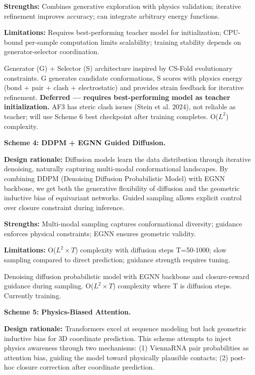 \documentclass[12pt]{article}
\begin{document}
\textbf{Strengths:} Combines generative exploration with physics validation; iterative refinement improves accuracy; can integrate arbitrary energy functions.

\textbf{Limitations:} Requires best-performing teacher model for initialization; CPU-bound per-sample computation limits scalability; training stability depends on generator-selector coordination.

Generator (G) + Selector (S) architecture inspired by CS-Fold evolutionary constraints. G generates candidate conformations, S scores with physics energy (bond + pair + clash + electrostatic) and provides strain feedback for iterative refinement. \textbf{Deferred — requires best-performing model as teacher initialization.} AF3 has steric clash issues (Stein et al. 2024), not reliable as teacher; will use Scheme 6 best checkpoint after training completes. O($L^2$) complexity.

\textbf{Scheme 4: DDPM + EGNN Guided Diffusion.}

\textbf{Design rationale:} Diffusion models learn the data distribution through iterative denoising, naturally capturing multi-modal conformational landscapes. By combining DDPM (Denoising Diffusion Probabilistic Model) \citep{ho2020} with EGNN backbone, we get both the generative flexibility of diffusion and the geometric inductive bias of equivariant networks. Guided sampling allows explicit control over closure constraint during inference.

\textbf{Strengths:} Multi-modal sampling captures conformational diversity; guidance enforces physical constraints; EGNN ensures geometric validity.

\textbf{Limitations:} O($L^2 \times T$) complexity with diffusion steps T=50-1000; slow sampling compared to direct prediction; guidance strength requires tuning.

Denoising diffusion probabilistic model \citep{ho2020} with EGNN backbone and closure-reward guidance during sampling. O($L^2 \times T$) complexity where T is diffusion steps. Currently training.

\textbf{Scheme 5: Physics-Biased Attention.}

\textbf{Design rationale:} Transformers excel at sequence modeling but lack geometric inductive bias for 3D coordinate prediction. This scheme attempts to inject physics awareness through two mechanisms: (1) ViennaRNA pair probabilities as attention bias, guiding the model toward physically plausible contacts; (2) post-hoc closure correction after coordinate prediction.
\end{document}
